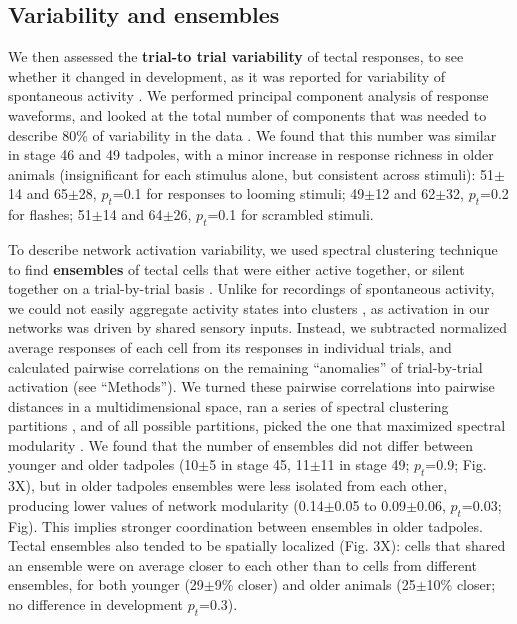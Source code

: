 \documentclass{article}
\begin{document}

\subsection*{Variability and ensembles}

We then assessed the \textbf{trial-to trial variability} of tectal responses, to see whether it changed in development, as it was reported for variability of spontaneous activity \citep{xu2011}. We performed principal component analysis of response waveforms, and looked at the total number of components that was needed to describe 80\% of variability in the data \citep{avitan2017spontaneous}. We found that this number was similar in stage 46 and 49 tadpoles, with a minor increase in response richness in older animals (insignificant for each stimulus alone, but consistent across stimuli): 51$\pm$14 and 65$\pm$28, $p_t$=0.1 for responses to looming stimuli; 49$\pm$12 and 62$\pm$32, $p_t$=0.2 for flashes; 51$\pm$14 and 64$\pm$26, $p_t$=0.1 for scrambled stimuli.

To describe network activation variability, we used spectral clustering technique to find \textbf{ensembles} of tectal cells that were either active together, or silent together on a trial-by-trial basis \citep{thompson2016ensembles}. Unlike for recordings of spontaneous activity, we could not easily aggregate activity states into clusters \citep{avitan2017spontaneous}, as activation in our networks was driven by shared sensory inputs. Instead, we subtracted normalized average responses of each cell from its responses in individual trials, and calculated pairwise correlations on the remaining “anomalies” of trial-by-trial activation (see “Methods”). We turned these pairwise correlations into pairwise distances in a multidimensional space, ran a series of spectral clustering partitions \citep{ng2002spectral}, and of all possible partitions, picked the one that maximized spectral modularity \citep{newman2006modularity,gomez2009community}. We found that the number of ensembles did not differ between younger and older tadpoles (10$\pm$5 in stage 45, 11$\pm$11 in stage 49; $p_t$=0.9; Fig. 3X), but in older tadpoles ensembles were less isolated from each other, producing lower values of network modularity (0.14$\pm$0.05 to 0.09$\pm$0.06, $p_t$=0.03; Fig). This implies stronger coordination between ensembles in older tadpoles. Tectal ensembles also tended to be spatially localized (Fig. 3X): cells that shared an ensemble were on average closer to each other than to cells from different ensembles, for both younger (29$\pm$9\% closer) and older animals (25$\pm$10\% closer; no difference in development $p_t$=0.3).
\end{document}
